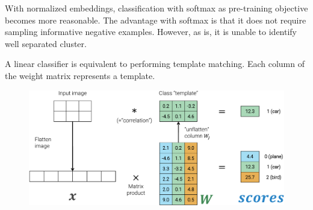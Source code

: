 \begin{remark}
    With normalized embeddings, classification with softmax as pre-training objective becomes more reasonable. The advantage with softmax is that it does not require sampling informative negative examples. However, as is, it is unable to identify well separated cluster.
\end{remark}

\begin{remark}
    A linear classifier is equivalent to performing template matching. Each column of the weight matrix represents a template.

    \begin{figure}[H]
        \centering
        \includegraphics[width=0.6\linewidth]{./img/_template_matching.pdf}
    \end{figure}
\end{remark}

